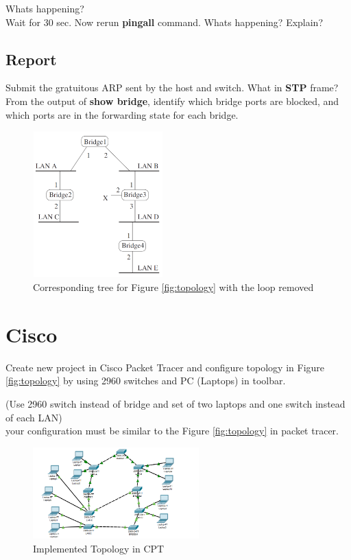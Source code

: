 \documentclass[10pt,a4paper]{article}
\numberwithin{equation}{section}
\numberwithin{figure}{section}
\numberwithin{table}{section}
\begin{document}
    Whats happening?\\
    Wait for 30 sec. Now rerun \textbf{pingall} command.
    Whats happening? Explain?

    \subsection{Report}
    Submit the gratuitous ARP sent by the host and switch. What in \textbf{STP} frame?\\
    From the output of \textbf{show bridge}, identify which bridge ports are blocked, and which ports are in the forwarding state for each bridge.

\begin{figure}[H]
    \centering
    \includegraphics[height=160pt]{img/fig1-2.png}
    \caption{Corresponding tree for Figure \ref{fig:topology} with the loop removed}
    \label{fig:topology-simple}
\end{figure}

\section{Cisco}
    Create new project in Cisco Packet Tracer and configure topology in Figure \ref{fig:topology} by using 2960 switches and PC (Laptops) in toolbar.

(Use 2960 switch instead of bridge and set of two laptops and one switch instead of each LAN)\\
your configuration must be similar to the Figure \ref{fig:topology} in packet tracer.

\begin{figure}[H]
	\centering
    \includegraphics[height=100pt]{img/fig2.png}
    \caption{Implemented Topology in CPT}
\end{figure}
\end{document}
